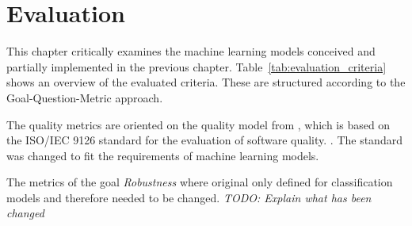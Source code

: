 \chapter{Evaluation}
This chapter critically examines the machine learning models conceived and partially implemented in the previous chapter.
Table~\ref*{tab:evaluation_criteria} shows an overview of the evaluated criteria. These are structured according to the Goal-Question-Metric approach.

The quality metrics are oriented on the quality model from \cite[]{siebert_constructionqualitymodel_}, which is based on the ISO/IEC 9126 standard for the evaluation of software quality. \cite[]{iso9126_softwareproductqualitymodel_}. The standard was changed to fit the requirements of machine learning models.

The metrics of the goal \textit{Robustness} where original only defined for classification models and therefore needed to be changed.
\textit{TODO: Explain what has been changed}


